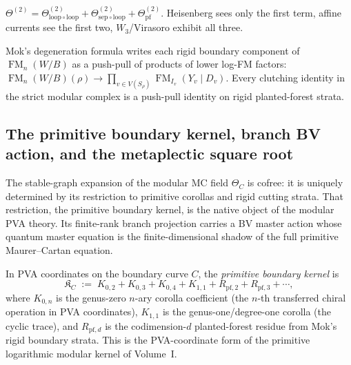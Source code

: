 \begin{remark}
\label{rem:vol2-genus-two-entry}
$\Theta^{(2)}
=
\Theta^{(2)}_{\mathrm{loop}\circ\mathrm{loop}}
+\Theta^{(2)}_{\mathrm{sep}\circ\mathrm{loop}}
+\Theta^{(2)}_{\mathrm{pf}}$.
Heisenberg sees only the first term, affine currents see the first two,
$W_3$/Virasoro exhibit all three.
\end{remark}

\begin{remark}
\label{rem:vol2-rigid-type-boundary-factorization}
Mok's degeneration formula writes each rigid boundary component of
$\operatorname{FM}_n(W/B)$ as a push-pull of products of lower log-FM factors:
$\operatorname{FM}_n(W/B)(\rho)\to
\prod_{v\in V(S_\rho)}\operatorname{FM}_{I_v}(Y_v\mathbin{|}D_v)$.
Every clutching identity in the strict modular complex is a
push-pull identity on rigid planted-forest strata.
\end{remark}


\subsection{The primitive boundary kernel, branch BV action,
and the metaplectic square root}
\label{subsec:vol2-primitive-kernel-branch-bv}

The stable-graph expansion of the modular MC field $\Theta_C$ is cofree:
it is uniquely determined by its restriction to primitive corollas and
rigid cutting strata. That restriction, the primitive boundary kernel,
is the native object of the modular PVA theory. Its finite-rank
branch projection carries a BV master action whose quantum master equation
is the finite-dimensional shadow of the full primitive Maurer--Cartan
equation.

\begin{definition}
\label{def:vol2-primitive-boundary-kernel}

In PVA coordinates on the boundary curve $C$, the
\emph{primitive boundary kernel} is
\begin{equation}
\label{eq:vol2-primitive-kernel}
\mathfrak{K}_C
\;:=\;
K_{0,2} + K_{0,3} + K_{0,4}
+ K_{1,1}
+ R_{\mathrm{pf},2} + R_{\mathrm{pf},3} + \cdots,
\end{equation}
where $K_{0,n}$ is the genus-zero $n$-ary corolla coefficient
\textup{(}the $n$-th transferred chiral operation in PVA
coordinates\textup{)}, $K_{1,1}$ is the genus-one/degree-one corolla
\textup{(}the cyclic trace\textup{)}, and $R_{\mathrm{pf},d}$ is the
codimension-$d$ planted-forest residue from Mok's rigid boundary
strata. This is the PVA-coordinate form of
the primitive logarithmic modular kernel of Volume~I.
\end{definition}


